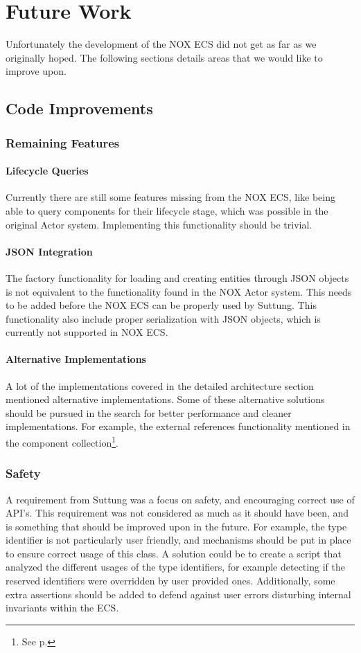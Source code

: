 \chapter{Future Work}
\label{chap:future_work}
Unfortunately the development of the NOX ECS did not get as far as we originally hoped.
The following sections details areas that we would like to improve upon.

\section{Code Improvements}
\subsection{Remaining Features}
\subsubsection{Lifecycle Queries}
Currently there are still some features missing from the NOX ECS, like being able to query
components for their lifecycle stage, which was possible in the original Actor system.
Implementing this functionality should be trivial.

\subsubsection{JSON Integration}
The factory functionality for loading and creating entities through JSON objects
is not equivalent to the functionality found in the NOX Actor system.
This needs to be added before the NOX ECS can be properly used by Suttung.
This functionality also include proper serialization with JSON objects, which
is currently not supported in NOX ECS.

\subsubsection{Alternative Implementations}
A lot of the implementations covered in the detailed architecture section mentioned alternative
implementations. Some of these alternative solutions should be pursued in the search for
better performance and cleaner implementations. For example, the external references functionality
mentioned in the component collection\footnote{See p.\pageref{subpar:detailed_component_collection_external_references}}.

\subsection{Safety}
A requirement from Suttung was a focus on safety, and encouraging correct use of API's.
This requirement was not considered as much as it should have been, and is something that
should be improved upon in the future.
For example, the type identifier is not particularly user friendly, and mechanisms should
be put in place to ensure correct usage of this class.
A solution could be to create a script that analyzed the different usages of the type identifiers,
for example detecting if the reserved identifiers were overridden by user provided ones.
Additionally, some extra assertions should be added to defend against user errors disturbing internal
invariants within the ECS.

